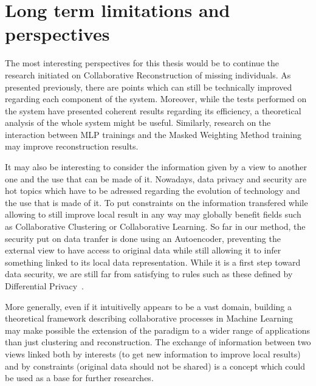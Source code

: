 \section{Long term limitations and perspectives}

The most interesting perspectives for this thesis would be to continue the research initiated on Collaborative Reconstruction of missing individuals. As presented previously, there are points which can still be technically improved regarding each component of the system. Moreover, while the tests performed on the system have presented coherent results regarding its efficiency, a theoretical analysis of the whole system might be useful. Similarly, research on the interaction between MLP trainings and the Masked Weighting Method training may improve reconstruction results.

It may also be interesting to consider the information given by a view to another one and the use that can be made of it. Nowadays, data privacy and security are hot topics which have to be adressed regarding the evolution of technology and the use that is made of it. To put constraints on the information transfered while allowing to still improve local result in any way may globally benefit fields such as Collaborative Clustering or Collaborative Learning. So far in our method, the security put on data tranfer is done using an Autoencoder, preventing the external view to have access to original data while still allowing it to infer something linked to its local data representation. While it is a first step toward data security, we are still far from satisfying to rules such as these defined by Differential Privacy~\cite{dwork2010differential}.

More generally, even if it intuitivelly appears to be a vast domain, building a theoretical framework describing collaborative processes in Machine Learning may make possible the extension of the paradigm to a wider range of applications than just clustering and reconstruction. The exchange of information between two views linked both by interests (to get new information to improve local results) and by constraints (original data should not be shared) is a concept which could be used as a base for further researches.

